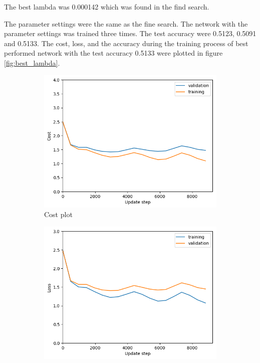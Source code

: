\documentclass[12pt]{article}
\newenvironment{question}[2][Question]{\begin{trivlist}
\kern10pt
\item[\hskip \labelsep {\bfseries #1}\hskip \labelsep {\bfseries #2.}]}{\end{trivlist}}
\begin{document}
\begin{question}{v}
The best lambda was 0.000142 which was found in the find search.

The parameter settings were the same as the fine search. The network with the
parameter settings was trained three times. The test accuracy were 0.5123, 0.5091
and 0.5133. The cost, loss, and the accuracy during the training process of best performed network
with the test accuracy 0.5133 were plotted in figure \ref{fig:best_lambda}.

\begin{figure}[!htb]
    \begin{subfigure}[b]{0.32\textwidth}
        \includegraphics[width=\linewidth]{f5_cost_plt.png}
        \caption{Cost plot}
    \end{subfigure}
    \hfill
    \begin{subfigure}[b]{0.32\textwidth}
        \includegraphics[width=\linewidth]{f5_loss_plt.png}

\end{subfigure}
\end{figure}
\end{question}
\end{document}
